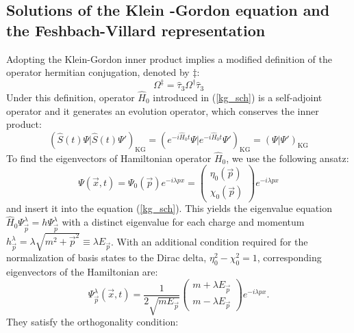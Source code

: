 \documentclass[11pt]{article}
\numberwithin{equation}{section}
\begin{document}
      \subsection{Solutions of the Klein -Gordon equation and the Feshbach-Villard representation}
      Adopting the Klein-Gordon inner product implies a modified definition of the operator hermitian conjugation, denoted by $\ddagger$:
      \begin{equation}
        \Omega^\ddagger = \hat \tau_3 \Omega^\dagger \hat \tau_3
      \end{equation}
      Under this definition, operator $\hat H_0$ introduced in (\ref{kg_sch}) is a self-adjoint operator and
      it generates an evolution operator, which conserves the inner product: %
      \begin{equation}
        (\hat S(t) \Psi | \hat S(t) \Psi')_{\text{KG}} = (e^{-i \hat H_0 t} \Psi | e^{-i \hat H_0 t} \Psi')_{\text{KG}} =  (\Psi | \Psi')_{\text{KG}}
      \end{equation}
      To find the eigenvectors of Hamiltonian operator $\hat H_0$, we use the following ansatz:
      \begin{equation}
        \Psi(\vec x, t) = \Psi_0(\vec p) e^{-i \lambda p x} = \begin{pmatrix}
          \eta_0(\vec p)\\
          \chi_0(\vec p)
        \end{pmatrix} e^{-i \lambda p x} 
      \end{equation}
      and insert it into the equation (\ref{kg_sch}).
      This yields the eigenvalue equation $\hat H_0 \Psi_{\vec p}^\lambda = h \Psi_{\vec p}^\lambda$ with a distinct eigenvalue for each charge and momentum $h_{\vec p}^\lambda = \lambda \sqrt{m^2+\vec p^2} \equiv \lambda E_{\vec p}$.
      With an additional condition required for the normalization of basis states to the Dirac delta, $\eta_0^2 - \chi_0^2 = 1$, corresponding eigenvectors of the Hamiltonian are:
      \begin{equation}
        \Psi^\lambda_{\vec p}(\vec x, t) = 
        \frac{1}{2 \sqrt{m E_{\vec p}}}
        \begin{pmatrix}
          m + \lambda E_{\vec p} \\
          m - \lambda E_{\vec p}
        \end{pmatrix}
        e^{-i \lambda p x}.
      \end{equation}
      They satisfy the orthogonality condition:
\end{document}
